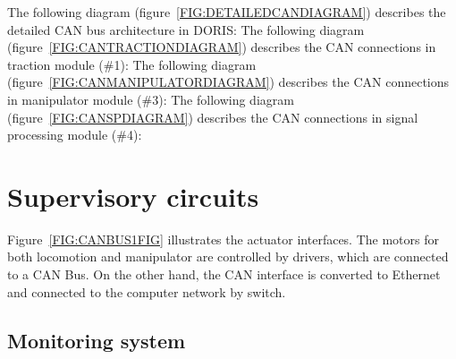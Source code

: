 The following diagram (figure~\ref{FIG:DETAILEDCANDIAGRAM}) describes the detailed CAN bus architecture in DORIS:
The following diagram (figure~\ref{FIG:CANTRACTIONDIAGRAM}) describes the CAN connections in traction module (\#1):
The following diagram (figure~\ref{FIG:CANMANIPULATORDIAGRAM}) describes the CAN connections in manipulator module (\#3):
The following diagram (figure~\ref{FIG:CANSPDIAGRAM}) describes the CAN connections in signal processing module (\#4):

\section{Supervisory circuits}
Figure~\ref{FIG:CANBUS1FIG} illustrates the actuator interfaces. The motors for both locomotion and manipulator are controlled by drivers, which are connected to a CAN Bus. On the other hand, the CAN interface is converted to Ethernet and connected to the computer network by switch.
\subsection{Monitoring system}
